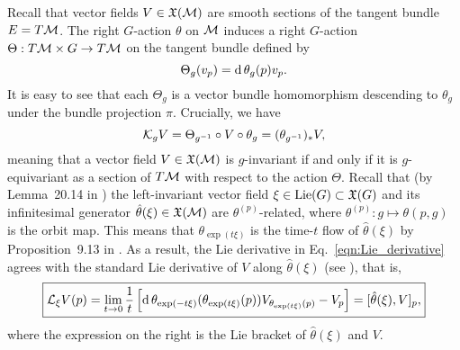 \documentclass[twoside,11pt]{article}
\begin{document}
    Recall that vector fields $V\in\mathfrak{X}({\mathcal{M}})$ are smooth sections of the tangent bundle $E = T{\mathcal{M}}$. 
    The right $G$-action $\theta$ on ${\mathcal{M}}$ induces a right $G$-action $\Theta: T{\mathcal{M}} \times G \to T{\mathcal{M}}$ on the tangent bundle defined by
    \begin{equation}
        \Theta_g(v_p) = \operatorname{\mathrm{d}}\theta_g(p) v_p.
    \end{equation}
    It is easy to see that each $\Theta_g$ is a vector bundle homomorphism descending to $\theta_g$ under the bundle projection $\pi$.
    Crucially, we have
    \begin{equation}
        {\mathcal{K}}_g V 
        = \Theta_{g^{-1}} \circ V \circ \theta_g
        = (\theta_{g^{-1}})_* V,
    \end{equation}
    meaning that a vector field $V\in\mathfrak{X}({\mathcal{M}})$ is $g$-invariant if and only if it is $g$-equivariant as a section of $T{\mathcal{M}}$ with respect to the action $\Theta$.
    Recall that (by Lemma~20.14 in \citet{Lee2013introduction}) the left-invariant vector field $\xi \in \operatorname{Lie}(G) \subset \mathfrak{X}(G)$ and its infinitesimal generator $\hat{\theta}(\xi) \in \mathfrak{X}({\mathcal{M}})$ are $\theta^{(p)}$-related, where $\theta^{(p)}: g \mapsto \theta(p,g)$ is the orbit map.
    This means that $\theta_{\exp(t\xi)}$ is the time-$t$ flow of $\hat{\theta}(\xi)$ by Proposition~9.13 in \citet{Lee2013introduction}.
    As a result, the Lie derivative in Eq.~\ref{eqn:Lie_derivative} agrees with the standard Lie derivative of $V$ along $\hat{\theta}(\xi)$ (see \citet[p.228]{Lee2013introduction}),
    that is,
    \begin{equation}
    \boxed{
        {\mathcal{L}}_{\xi} V(p) 
        = \lim_{t\to 0} \frac{1}{t} \left[ \operatorname{\mathrm{d}}\theta_{\exp(-t\xi)}(\theta_{\exp(t\xi)}(p)) V_{\theta_{\exp(t\xi)}(p)} - V_p \right]
        = [\hat{\theta}(\xi), V]_p,
        }
    \end{equation}
    where the expression on the right is the Lie bracket of $\hat{\theta}(\xi)$ and $V$.
\end{document}
